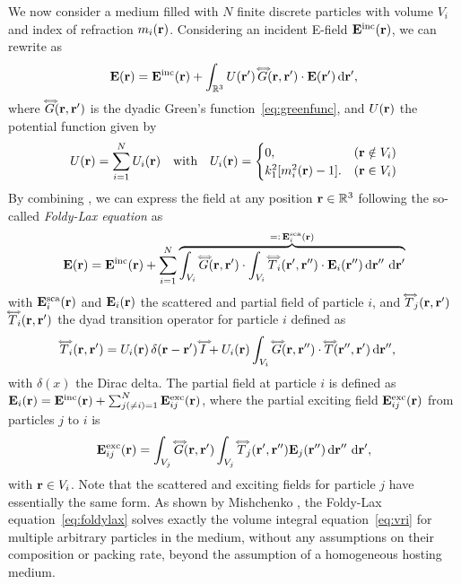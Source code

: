 We now consider a medium filled with $N$ finite discrete particles with volume $V_i$ and index of refraction $m_i(\mathbf{r})$. Considering an incident E-field $\mathbf{E}^\mathrm{inc}(\mathbf{r})$, we can rewrite  as
\begin{equation}
    \mathbf{E}(\mathbf{r}) = \mathbf{E}^\mathrm{inc}(\mathbf{r}) + \int_{\mathbb{R}^3} U(\mathbf{r}')\,{\accentset{\Longleftrightarrow}{G}}(\mathbf{r},\mathbf{r}') \cdot \mathbf{E}(\mathbf{r}') \,\mathrm{d} \mathbf{r}',
    \label{eq:EfieldParticles}
\end{equation}
where ${\accentset{\Longleftrightarrow}{G}}(\mathbf{r},\mathbf{r}')$ is the dyadic Green's function~\eqref{eq:greenfunc}, and $U(\mathbf{r})$ the potential function given by
\begin{equation}
    U(\mathbf{r}) = \sum_{i=1}^{N} U_i(\mathbf{r}) \quad \text{with} \quad U_i(\mathbf{r}) = \begin{cases} 
    0, & (\mathbf{r} \notin V_i)\\ 
    k_1^2[m_i^2(\mathbf{r})-1]. & (\mathbf{r} \in V_i)
    \end{cases}
    \label{eq:potential}
\end{equation}
By combining , we can express the field at any position $\mathbf{r}\in\mathbb{R}^3$ following the so-called \emph{Foldy-Lax equation} \cite{foldy1945multiple,lax1951multiple} as
\begin{equation}
\mathbf{E}(\mathbf{r}) = \mathbf{E}^\mathrm{inc}(\mathbf{r}) + \sum_{i=1}^N \overbrace{\int_{V_i} {\accentset{\Longleftrightarrow}{G}}(\mathbf{r},\mathbf{r}')\cdot \int_{V_i} {\accentset{\Longleftrightarrow}{T}}_i(\mathbf{r}',\mathbf{r}'') \cdot  \mathbf{E}_i(\mathbf{r}'') \,\mathrm{d} \mathbf{r}''\, \,\mathrm{d} \mathbf{r}'}^{=\vcentcolon \,\mathbf{E}^\mathrm{sca}_i(\mathbf{r})}    \label{eq:foldylax}
\end{equation}
with $\mathbf{E}^\mathrm{sca}_i(\mathbf{r})$ and $\mathbf{E}_i(\mathbf{r})$ the scattered and partial field of particle $i$, and ${\accentset{\Longleftrightarrow}{T}}_j(\mathbf{r},\mathbf{r}')$ ${\accentset{\Longleftrightarrow}{T}}_i(\mathbf{r},\mathbf{r}')$ the dyad transition operator for particle $i$ defined as \cite{tsang1985theory} 
\begin{equation}
\label{eq:dyadtransition}
    \begin{split}
        {\accentset{\Longleftrightarrow}{T}}_i(\mathbf{r},\mathbf{r}') =\;& U_i(\mathbf{r}) \,\delta(\mathbf{r}-\mathbf{r}')\,{\accentset{\Longleftrightarrow}{I}} + U_i(\mathbf{r}) \int_{V_i} {\accentset{\Longleftrightarrow}{G}}(\mathbf{r},\mathbf{r}'') \cdot {\accentset{\Longleftrightarrow}{T}}(\mathbf{r}'',\mathbf{r}') \,\mathrm{d} \mathbf{r}'',
    \end{split}
\end{equation}
with $\delta(x)$ the Dirac delta. 
The partial field at particle $i$ is defined as $\mathbf{E}_i(\mathbf{r})=\mathbf{E}^\mathrm{inc}(\mathbf{r}) + \sum_{j(\neq i)=1}^N \mathbf{E}^\mathrm{exc}_{ij}(\mathbf{r})$, where the partial exciting field $\mathbf{E}^\mathrm{exc}_{ij}(\mathbf{r})$ from particles $j$ to $i$ is 
\begin{equation}
\mathbf{E}^\mathrm{exc}_{ij}(\mathbf{r}) = \int_{V_j} {\accentset{\Longleftrightarrow}{G}}(\mathbf{r},\mathbf{r}')\int_{V_j} {\accentset{\Longleftrightarrow}{T}}_j(\mathbf{r}',\mathbf{r}'') \mathbf{E}_j(\mathbf{r}'') \,\mathrm{d} \mathbf{r}''\,\,\mathrm{d} \mathbf{r}',
\label{eq:excfield}
\end{equation}
with $\mathbf{r}\in V_i$. Note that the scattered and exciting fields for particle $j$ have essentially the same form. 
As shown by Mishchenko \cite{mishchenko2002vector}, the Foldy-Lax equation~\eqref{eq:foldylax} solves exactly the volume integral equation~\eqref{eq:vri} for multiple arbitrary particles in the medium, without any assumptions on their composition or packing rate, beyond the assumption of a homogeneous hosting medium.


